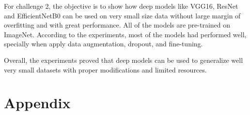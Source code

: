 \documentclass[10pt,twocolumn,letterpaper]{article}
\begin{document}
For challenge 2, the objective is to show how deep models like VGG16, ResNet and EfficientNetB0 can be used on very small size data without large margin of overfitting and with great performance. All of the models are pre-trained on ImageNet. According to the experiments, most of the models had performed well, specially when apply data 
augmentation, dropout, and fine-tuning.

Overall, the experiments proved that deep models can be used to generalize well very small datasets with proper modifications and limited resources.






{\small


}


\newpage
\appendix


\section*{Appendix}
\end{document}

